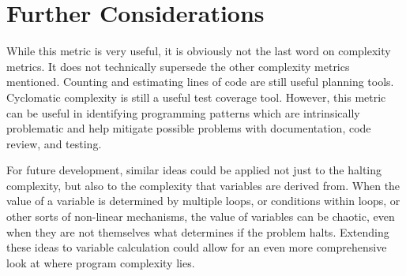 \section{Further Considerations}

While this metric is very useful, it is obviously not the last word on complexity metrics.  It does not technically supersede the other complexity metrics mentioned.  Counting and estimating lines of code are still useful planning tools.  Cyclomatic complexity is still a useful test coverage tool.  However, this metric can be useful in identifying programming patterns which are intrinsically problematic and help mitigate possible problems with documentation, code review, and testing.  

For future development, similar ideas could be applied not just to the halting complexity, but also to the complexity that variables are derived from.  When the value of a variable is determined by multiple loops, or conditions within loops, or other sorts of non-linear mechanisms, the value of variables can be chaotic, even when they are not themselves what determines if the problem halts.  Extending these ideas to variable calculation could allow for an even more comprehensive look at where program complexity lies.

